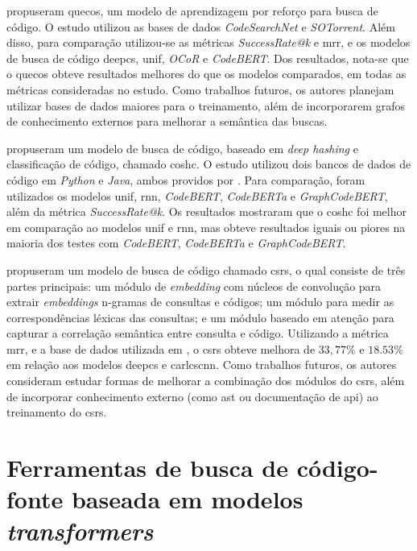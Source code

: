 \textcite{Wang2022EnrichingQS} propuseram \gls{quecos}, um modelo de aprendizagem por reforço para busca de código. O estudo utilizou as bases de dados \textit{CodeSearchNet} \cite{Husain2019CodeSearchNetCE} e \textit{SOTorrent}. Além disso, para comparação utilizou-se as métricas \textit{SuccessRate@k} e \gls{mrr}, e os modelos de busca de código \gls{deepcs}, \gls{unif}, \textit{OCoR} e \textit{CodeBERT}. Dos resultados, nota-se que o \gls{quecos} obteve resultados melhores do que os modelos comparados, em todas as métricas consideradas no estudo. Como trabalhos futuros, os autores planejam utilizar bases de dados maiores para o treinamento, além de incorporarem grafos de conhecimento externos para melhorar a semântica das buscas.

\textcite{Gu2022AcceleratingCS} propuseram um modelo de busca de código, baseado em \textit{deep hashing} e classificação de código, chamado \gls{coshc}. O estudo utilizou dois bancos de dados de código em \textit{Python} e \textit{Java}, ambos providos por \cite{Feng2020CodeBERTAP}. Para comparação, foram utilizados os modelos \gls{unif}, \gls{rnn}, \textit{CodeBERT}, \textit{CodeBERTa} e \textit{GraphCodeBERT}, além da métrica \textit{SuccessRate@k}. Os resultados mostraram que o \gls{coshc} foi melhor em comparação ao modelos \gls{unif} e \gls{rnn}, mas obteve resultados iguais ou piores na maioria dos testes com \textit{CodeBERT}, \textit{CodeBERTa} e \textit{GraphCodeBERT}.

\textcite{Cheng2022CSRSCS} propuseram um modelo de busca de código chamado \gls{csrs}, o qual consiste de três partes principais: um módulo de \textit{embedding} com núcleos de convolução para extrair \textit{embeddings} n-gramas de consultas e códigos; um módulo para medir as correspondências léxicas das consultas; e um módulo baseado em atenção para capturar a correlação semântica entre consulta e código. Utilizando a métrica \gls{mrr}, e a base de dados utilizada em \cite{Gu2018DeepCS}, o \gls{csrs} obteve melhora de $33,77\%$ e $18.53\%$ em relação aos modelos \gls{deepcs} e \gls{carlcscnn}. Como trabalhos futuros, os autores consideram estudar formas de melhorar a combinação dos módulos do \gls{csrs}, além de incorporar conhecimento externo (como \gls{ast} ou documentação de \gls{api}) ao treinamento do \gls{csrs}.

\section{Ferramentas de busca de código-fonte baseada em modelos \textit{transformers}}

